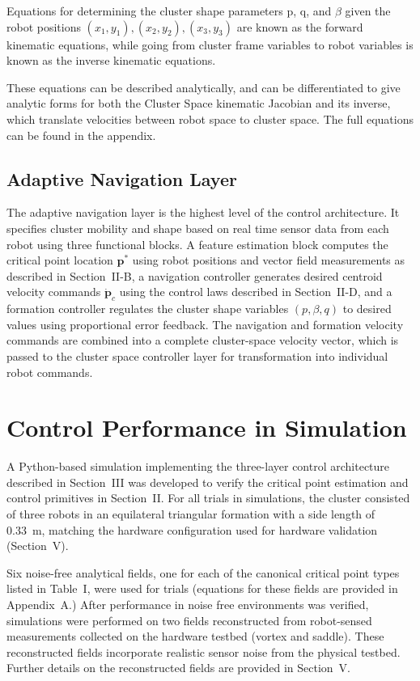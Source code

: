 \documentclass[lettersize,journal]{IEEEtran}
\begin{document}
Equations for determining the cluster shape parameters p, q, and $\beta$ given the robot positions $(x_1, y_1), (x_2, y_2), (x_3, y_3)$ are known as the forward kinematic equations, while going from cluster frame variables to robot variables is known as the inverse kinematic equations.

These equations can be described analytically, and can be differentiated to give analytic forms for both the Cluster Space kinematic Jacobian and its inverse, which translate velocities between robot space to cluster space. The full equations can be found in the appendix.


\subsection{Adaptive Navigation Layer}

The adaptive navigation layer is the highest level of the control architecture. It specifies cluster mobility and shape based on real time sensor data from each robot using three functional blocks. A feature estimation block computes the critical point location $\mathbf{p}^*$ using robot positions and vector field measurements as described in Section~II-B, a navigation controller generates desired centroid velocity commands $\dot{\mathbf{p}}_c$ using the control laws described in Section~II-D, and a formation controller regulates the cluster shape variables $(p, \beta, q)$ to desired values using proportional error feedback. The navigation and formation velocity commands are combined into a complete cluster-space velocity vector, which is passed to the cluster space controller layer for transformation into individual robot commands.


\section{Control Performance in Simulation}

A Python-based simulation implementing the three-layer control architecture described in Section~III was developed to verify the critical point estimation and control primitives in Section~II. For all trials in simulations, the cluster consisted of three robots in an equilateral triangular formation with a side length of 0.33~m, matching the hardware configuration used for hardware validation (Section~V).

Six noise-free analytical fields, one for each of the canonical critical point types listed in Table~I, were used for trials (equations for these fields are provided in Appendix~A.) After performance in noise free environments was verified, simulations were performed on two fields reconstructed from robot-sensed measurements collected on the hardware testbed (vortex and saddle). These reconstructed fields incorporate realistic sensor noise from the physical testbed. Further details on the reconstructed fields are provided in Section~V.
\end{document}
